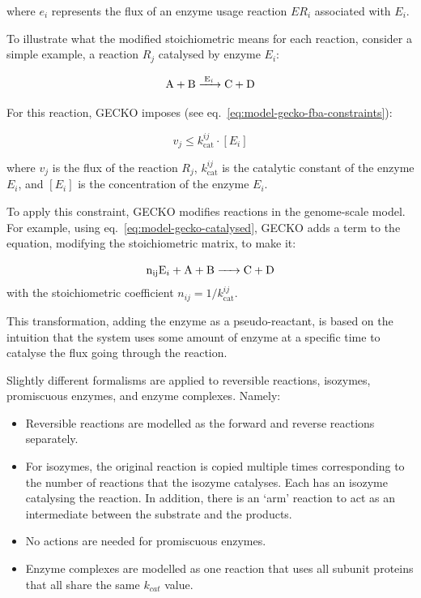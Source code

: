 where $e_{i}$ represents the flux of an enzyme usage reaction $ER_{i}$ associated with $E_{i}$.

To illustrate what the modified stoichiometric means for each reaction, consider a simple example, a reaction $R_{j}$ catalysed by enzyme $E_{i}$:

\begin{equation}
  \ce{ A + B ->[E_{i}] C + D }
  \label{eq:model-gecko-catalysed}
\end{equation}

For this reaction, GECKO imposes (see eq.\ \ref{eq:model-gecko-fba-constraints}):

\begin{equation}
  v_{j} \leq k_{\mathrm{cat}}^{ij} \cdot [E_{i}]
  \label{eq:model-gecko-kcat}
\end{equation}

where $v_{j}$ is the flux of the reaction $R_{j}$, $k_{\mathrm{cat}}^{ij}$ is the catalytic constant of the enzyme $E_{i}$, and $[E_{i}]$ is the concentration of the enzyme $E_{i}$.

To apply this constraint, GECKO modifies reactions in the genome-scale model.
For example, using eq.\ \ref{eq:model-gecko-catalysed},
GECKO adds a term to the equation, modifying the stoichiometric matrix, to make it:

\begin{equation}
  \ce{ n_{ij}E_{i} + A + B -> C + D }
  \label{eq:model-gecko-catalysed-formalism}
\end{equation}
with the stoichiometric coefficient $n_{ij} = 1/k_{\mathrm{cat}}^{ij}$.

This transformation, adding the enzyme as a pseudo-reactant, is based on the intuition that the system uses some amount of enzyme at a specific time to catalyse the flux going through the reaction.

Slightly different formalisms are applied to reversible reactions, isozymes, promiscuous enzymes, and enzyme complexes.
Namely:
\begin{itemize}
  \item Reversible reactions are modelled as the forward and reverse reactions separately.
  \item For isozymes, the original reaction is copied multiple times corresponding to the number of reactions that the isozyme catalyses.
        Each has an isozyme catalysing the reaction.
        In addition, there is an `arm' reaction to act as an intermediate between the substrate and the products.
  \item No actions are needed for promiscuous enzymes.
  \item Enzyme complexes are modelled as one reaction that uses all subunit proteins that all share the same $k_{cat}$ value.
\end{itemize}

